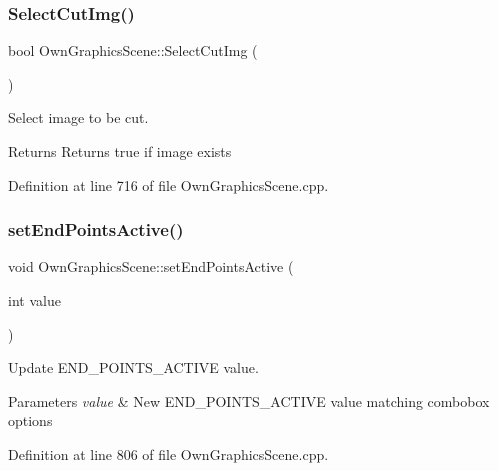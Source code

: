 \subsubsection{\texorpdfstring{Select\+Cut\+Img()}{SelectCutImg()}}
{\footnotesize\ttfamily bool Own\+Graphics\+Scene\+::\+Select\+Cut\+Img (\begin{DoxyParamCaption}{ }\end{DoxyParamCaption})}



Select image to be cut. 

\begin{DoxyReturn}{Returns}
Returns true if image exists 
\end{DoxyReturn}


Definition at line 716 of file Own\+Graphics\+Scene.\+cpp.

\mbox{\label{classOwnGraphicsScene_a3f4a8a31aa7a9efbf88c4d80c1cbc8ed}} 
\subsubsection{\texorpdfstring{set\+End\+Points\+Active()}{setEndPointsActive()}}
{\footnotesize\ttfamily void Own\+Graphics\+Scene\+::set\+End\+Points\+Active (\begin{DoxyParamCaption}\item[{int}]{value }\end{DoxyParamCaption})}



Update E\+N\+D\+\_\+\+P\+O\+I\+N\+T\+S\+\_\+\+A\+C\+T\+I\+VE value. 


\begin{DoxyParams}{Parameters}
{\em value} & New E\+N\+D\+\_\+\+P\+O\+I\+N\+T\+S\+\_\+\+A\+C\+T\+I\+VE value matching combobox options \\
\hline
\end{DoxyParams}


Definition at line 806 of file Own\+Graphics\+Scene.\+cpp.

\mbox{\label{classOwnGraphicsScene_a656919c9fdd0827ae182d3d3f5f91e4f}} 
